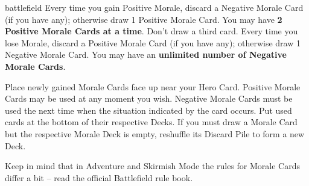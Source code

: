 \begin{multicols*}{2}
\begin{expansion}[before=\vspace*{-11mm}]{battlefield}
Every time you gain Positive Morale, discard a Negative Morale Card (if you have any); otherwise draw 1 Positive Morale Card.
You may have \textbf{2 Positive Morale Cards at a time}.
Don't draw a third card.
Every time you lose Morale, discard a Positive Morale Card (if you have any); otherwise draw 1 Negative Morale Card.
You may have an \textbf{unlimited number of Negative Morale Cards}.\par
Place newly gained Morale Cards face up near your Hero Card.
Positive Morale Cards may be used at any moment you wish.
Negative Morale Cards must be used the next time when the situation indicated by the card occurs.
Put used cards at the bottom of their respective Decks.
If you must draw a Morale Card but the respective Morale Deck is empty, reshuffle its Discard Pile to form a new Deck.

Keep in mind that in Adventure and Skirmish Mode the rules for Morale Cards differ a bit -- read the official Battlefield rule book.
\end{expansion}
\end{multicols*}
